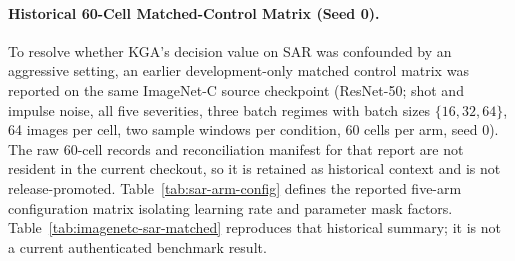 \paragraph{Historical 60-Cell Matched-Control Matrix (Seed 0).}
To resolve whether KGA's decision value on SAR was confounded by an aggressive setting,
an earlier development-only matched control matrix was reported on the same ImageNet-C source checkpoint
(ResNet-50; shot and impulse noise, all five severities, three batch regimes with batch sizes $\{16, 32, 64\}$,
64 images per cell, two sample windows per condition, 60 cells per arm, seed 0). The raw 60-cell
records and reconciliation manifest for that report are not resident in the current checkout, so it is
retained as historical context and is not release-promoted. Table~\ref{tab:sar-arm-config}
defines the reported five-arm configuration matrix isolating learning rate and parameter mask factors.
Table~\ref{tab:imagenetc-sar-matched} reproduces that historical summary; it is not a current
authenticated benchmark result.

\begin{table}[t]
\centering
\small
\caption{Historical configuration matrix for the five ImageNet-C SAR matched-control arms (ResNet-50, seed 0). The raw 60-cell records are not resident in the current checkout, so this matrix is not release-promotable. All reported arms perform test-time Batch Normalization statistics updates with per-batch model resets. Learning rate $\eta$, adapted affine parameters, and layer 4 status define each arm.}
\label{tab:sar-arm-config}
\end{table}


